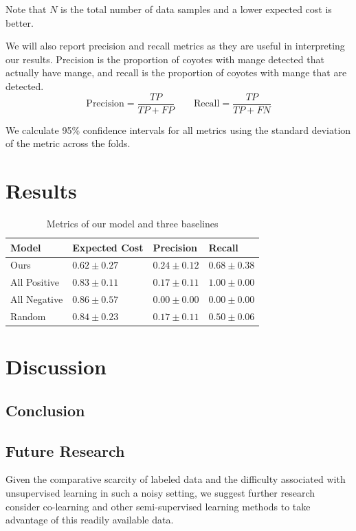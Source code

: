 \documentclass{article}
\begin{document}
Note that $N$ is the total number of data samples and a lower expected cost is
better.

We will also report precision and recall metrics as they are useful in
interpreting our results. Precision is the proportion of coyotes with mange
detected that actually have mange, and recall is the proportion of coyotes with
mange that are detected.
\begin{equation}
  \text{Precision} = \frac{TP}{TP+FP} \qquad \text{Recall} = \frac{TP}{TP+FN}
\end{equation}

We calculate 95\% confidence intervals for all metrics using the standard
deviation of the metric across the folds.

\section{Results} \label{sec:results}

\begin{table}
  \caption{Metrics of our model and three baselines}
  \label{results}
  \centering
  \begin{tabular}{llll}
    \topfigrule
    Model     & Expected Cost     & Precision & Recall \\
    \midrule
    Ours & $\mathbf{0.62} \pm 0.27$ & $\mathbf{0.24} \pm 0.12$ & $0.68 \pm 0.38$     \\
    All Positive & $0.83 \pm 0.11$    & $0.17 \pm 0.11$ & $\mathbf{1.00} \pm 0.00$     \\
    All Negative & $0.86 \pm 0.57$    & $0.00 \pm 0.00$ & $0.00 \pm 0.00$     \\
    Random & $0.84 \pm 0.23$    & $0.17 \pm 0.11$ & $0.50 \pm 0.06$     \\
    \bottomrule
  \end{tabular}
\end{table}

\section{Discussion} \label{sec:discussion}

\subsection{Conclusion}\label{sec:conclusion}

\subsection{Future Research}
Given the comparative scarcity of labeled data and the difficulty associated
with unsupervised learning in such a noisy setting, we suggest further research
consider co-learning and other semi-supervised learning methods to take
advantage of this readily available data.
\end{document}

